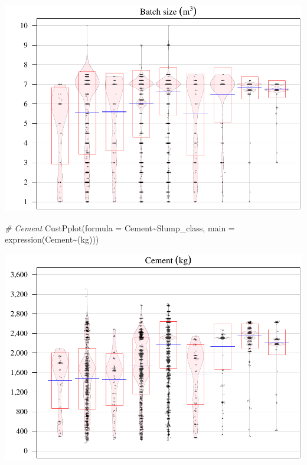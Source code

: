 \documentclass[
]{article}
\newenvironment{Shaded}{\begin{snugshade}}{\end{snugshade}}
\newcommand{\AttributeTok}[1]{\textcolor[rgb]{0.77,0.63,0.00}{#1}}
\newcommand{\CommentTok}[1]{\textcolor[rgb]{0.56,0.35,0.01}{\textit{#1}}}
\newcommand{\FunctionTok}[1]{\textcolor[rgb]{0.00,0.00,0.00}{#1}}
\newcommand{\NormalTok}[1]{#1}
\newcommand{\SpecialCharTok}[1]{\textcolor[rgb]{0.00,0.00,0.00}{#1}}
\begin{document}
\begin{center}\includegraphics{sl-inf-cairs-2301_files/figure-latex/dataInsights-1} \end{center}

\begin{Shaded}
\begin{Highlighting}[]
\CommentTok{\# Cement}
\FunctionTok{CustPplot}\NormalTok{(}\AttributeTok{formula =}\NormalTok{ Cement}\SpecialCharTok{\textasciitilde{}}\NormalTok{Slump\_class, }\AttributeTok{main =} \FunctionTok{expression}\NormalTok{(Cement}\SpecialCharTok{\textasciitilde{}}\NormalTok{(kg)))}
\end{Highlighting}
\end{Shaded}

\begin{center}\includegraphics{sl-inf-cairs-2301_files/figure-latex/dataInsights-2} \end{center}
\end{document}
